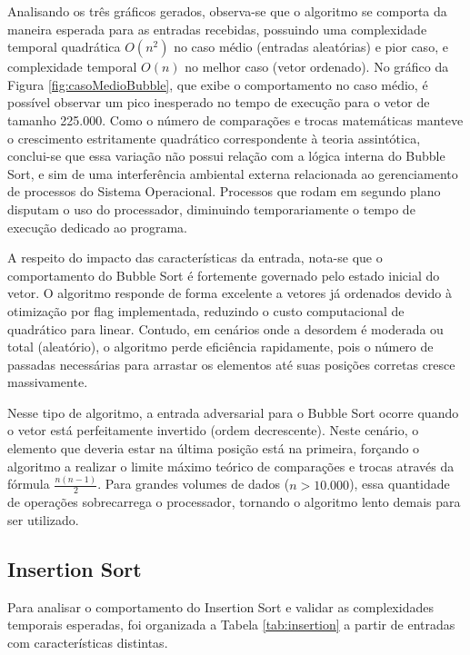 \documentclass{article}
\begin{document}
    Analisando os três gráficos gerados, observa-se que o algoritmo se comporta da maneira esperada para as entradas recebidas, possuindo uma complexidade temporal quadrática $O(n^2)$ no caso médio (entradas aleatórias) e pior caso, e complexidade temporal $O(n)$ no melhor caso (vetor ordenado).
    No gráfico da Figura \ref{fig:casoMedioBubble}, que exibe o comportamento no caso médio, é possível observar um pico inesperado no tempo de execução para o vetor de tamanho 225.000. 
    Como o número de comparações e trocas matemáticas manteve o crescimento estritamente quadrático correspondente à teoria assintótica, conclui-se que essa variação não possui relação com a lógica interna do Bubble Sort, e sim de uma interferência ambiental externa relacionada ao gerenciamento de processos do Sistema Operacional.
    Processos que rodam em segundo plano disputam o uso do processador, diminuindo temporariamente o tempo de execução dedicado ao programa.


    A respeito do impacto das características da entrada, nota-se que o comportamento do Bubble Sort é fortemente governado pelo estado inicial do vetor. 
    O algoritmo responde de forma excelente a vetores já ordenados devido à otimização por flag implementada, reduzindo o custo computacional de quadrático para linear. 
    Contudo, em cenários onde a desordem é moderada ou total (aleatório), o algoritmo perde eficiência rapidamente, pois o número de passadas necessárias para arrastar os elementos até suas posições corretas cresce massivamente.

    Nesse tipo de algoritmo, a entrada adversarial para o Bubble Sort ocorre quando o vetor está perfeitamente invertido (ordem decrescente). 
    Neste cenário, o elemento que deveria estar na última posição está na primeira, forçando o algoritmo a realizar o limite máximo teórico de comparações e trocas através da fórmula $\frac{n (n-1)}{2}$.
    Para grandes volumes de dados ($n > 10.000$), essa quantidade de operações sobrecarrega o processador, tornando o algoritmo lento demais para ser utilizado.
    
    \subsection{Insertion Sort}
    Para analisar o comportamento do Insertion Sort e validar as complexidades temporais esperadas, foi organizada a Tabela \ref{tab:insertion} a partir de entradas com características distintas.
\end{document}
